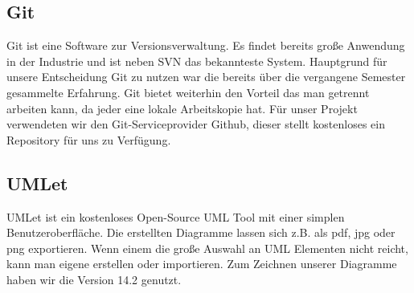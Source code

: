 \subsection{Git}

Git ist eine Software zur Versionsverwaltung. Es findet bereits große Anwendung in der Industrie und ist neben SVN das bekannteste System. Hauptgrund für unsere Entscheidung Git zu nutzen war die bereits über die vergangene Semester gesammelte Erfahrung. Git bietet weiterhin den Vorteil das man getrennt arbeiten kann, da jeder eine lokale Arbeitskopie hat. Für unser Projekt verwendeten wir den Git-Serviceprovider Github, dieser stellt kostenloses ein Repository für uns zu Verfügung.

\subsection{UMLet}

UMLet ist ein kostenloses Open-Source UML Tool mit einer simplen Benutzeroberfläche. Die erstellten Diagramme lassen sich z.B. als pdf, jpg oder png exportieren. Wenn einem die große Auswahl an UML Elementen nicht reicht, kann man eigene erstellen oder importieren. Zum Zeichnen unserer Diagramme haben wir die Version 14.2 genutzt. %

\newpage
